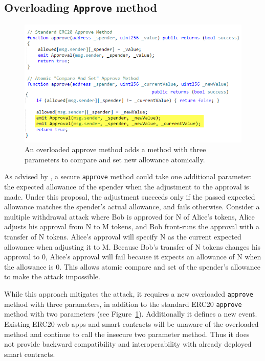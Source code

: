 
\subsection{Overloading \texttt{Approve} method}
\label{sec:overload}

\begin{figure}[t]
	\centering
	\includegraphics[width=1.0\linewidth]{figures/multiple_withdrawal_12.png}
	\caption{An overloaded approve method adds a method with three parameters to compare and set new allowance atomically.\label{fig:api}}
\end{figure}

As advised by \cite{Ref03}, a secure \texttt{approve} method could take one additional parameter: the expected allowance of the spender when the adjustment to the approval is made. Under this proposal, the adjustment succeeds only if the passed expected allowance matches the spender's actual allowance, and fails otherwise. Consider a multiple withdrawal attack where Bob is approved for N of Alice's tokens, Alice adjusts his approval from N to M tokens, and Bob front-runs the approval with a transfer of N tokens. Alice's approval will specify N as the current expected allowance when adjusting it to M. Because Bob's transfer of N tokens changes his approval to 0, Alice's approval will fail because it expects an allowance of N when the allowance is 0. This allows atomic compare and set of the spender's allowance to make the attack impossible. 

While this approach mitigates the attack, it requires a new overloaded \texttt{approve} method with three parameters, in addition to the standard ERC20 \texttt{approve} method with two parameters (see Figure~\ref{fig:api}). Additionally it defines a new event. Existing ERC20 web apps and smart contracts will be unaware of the overloaded method and continue to call the insecure two parameter method. Thus it does not provide backward compatibility and interoperability with already deployed smart contracts. 

